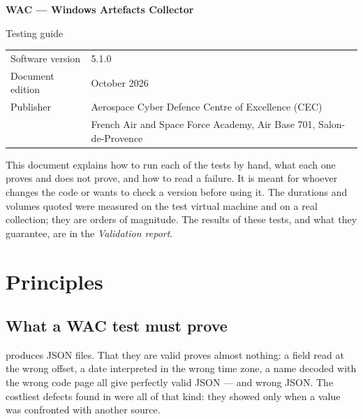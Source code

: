 \documentclass[11pt,a4paper,oneside]{report}
\begin{document}

\thispagestyle{empty}
\vspace*{\fill}
{\color{marine}\Large\bfseries WAC — Windows Artefacts Collector}\par
{\color{bleu}Testing guide}\par
\medskip
\begin{tabular}{@{}ll@{}}
Software version & 5.1.0 \\
Document edition & October 2026 \\
Publisher & Aerospace Cyber Defence Centre of Excellence (CEC) \\
          & French Air and Space Force Academy, Air Base 701, Salon-de-Provence \\
\end{tabular}

\bigskip
{\small\color{gris}This document explains how to run each of the \wac{} tests
by hand, what each one proves and does not prove, and how to read a failure. It
is meant for whoever changes the code or wants to check a version before using
it. The durations and volumes quoted were measured on the test virtual machine
and on a real collection; they are orders of magnitude. The results of these
tests, and what they guarantee, are in the \emph{Validation report}.}
\vspace*{2cm}
\clearpage

\tableofcontents

\chapter{Principles}

\section{What a WAC test must prove}

\wac{} produces JSON files. That they are valid proves almost nothing: a field
read at the wrong offset, a date interpreted in the wrong time zone, a name
decoded with the wrong code page all give perfectly valid JSON — and wrong
JSON. The costliest defects found in \wac{} were all of that kind: they showed
only when a value was confronted with another source.
\end{document}
